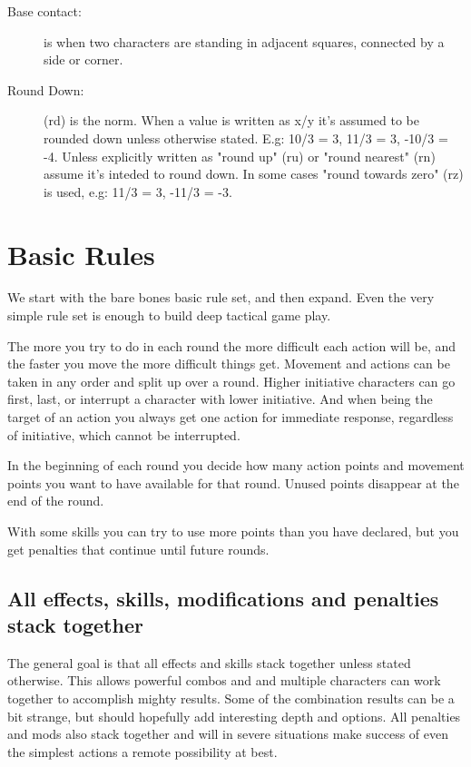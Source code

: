 \begin{description}
\item[Base contact:] is when two characters are standing in adjacent squares, connected by a side or corner.

\item[Round Down:] (rd) is the norm. When a value is written as x/y it's assumed to be rounded down unless otherwise stated. E.g: 10/3 = 3, 11/3 = 3, -10/3 = -4.
Unless explicitly written as "round up" (ru) or "round nearest" (rn) assume it's inteded to round down. In some cases "round towards zero" (rz) is used, e.g: 11/3 = 3, -11/3 = -3.

\end{description}










\section*{Basic Rules}
We start with the bare bones basic rule set, and then expand. Even the very simple rule set is enough to build deep tactical game play.

The more you try to do in each round the more difficult each action will be, and the faster you move the more difficult things get. Movement and actions can be taken in any order and split up over a round. Higher initiative characters can go first, last, or interrupt a character with lower initiative. And when being the target of an action you always get one action for immediate response, regardless of initiative, which cannot be interrupted.

In the beginning of each round you decide how many action points and movement points you want to have available for that round. Unused points disappear at the end of the round.

With some skills you can try to use more points than you have declared, but you get penalties that continue until future rounds.


\subsection*{All effects, skills, modifications and penalties stack together}
The general goal is that all effects and skills stack together unless stated otherwise. This allows powerful combos and and multiple characters can work together to accomplish mighty results. Some of the combination results can be a bit strange, but should hopefully add interesting depth and options.
All penalties and mods also stack together and will in severe situations make success of even the simplest actions a remote possibility at best.

